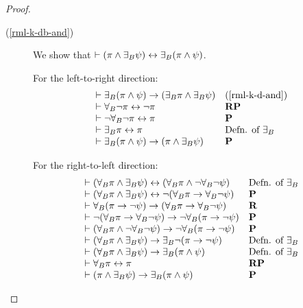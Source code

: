\begin{proof}
\begin{description}
    \item[(\ref{rml-k-db-and})]
    We show that $\vdash (\pi \land {\exists_{B}} \psi) \leftrightarrow {\exists_{B}} (\pi \land \psi)$.

    For the left-to-right direction:
    $$
    \begin{array}{ll}
        \vdash {\exists_{B}} (\pi \land \psi) \rightarrow ({\exists_{B}} \pi \land {\exists_{B}} \psi) & (\ref{rml-k-d-and})\\
        \vdash {\forall_{B}} \lnot \pi \leftrightarrow \lnot \pi & {\bf RP}\\
        \vdash \lnot {\forall_{B}} \lnot \pi \leftrightarrow \pi & {\bf P}\\
        \vdash {\exists_{B}} \pi \leftrightarrow \pi & \text{Defn. of ${\exists_{B}}$}\\
        \vdash {\exists_{B}} (\pi \land \psi) \rightarrow (\pi \land {\exists_{B}} \psi) & {\bf P}
    \end{array}
    $$

    For the right-to-left direction:
    $$
    \begin{array}{ll}
        \vdash ({\forall_{B}} \pi \land {\exists_{B}} \psi) \leftrightarrow ({\forall_{B}} \pi \land \lnot {\forall_{B}} \lnot \psi)& \text{Defn. of ${\exists_{B}}$}\\
        \vdash ({\forall_{B}} \pi \land {\exists_{B}} \psi) \leftrightarrow \lnot ({\forall_{B}} \pi \rightarrow {\forall_{B}} \lnot \psi)& {\bf P}\\
        \vdash {\forall_{B}} (\pi \rightarrow \lnot \psi) \rightarrow ({\forall_{B}} \pi \rightarrow {\forall_{B}} \lnot \psi)& {\bf R}\\
        \vdash \lnot ({\forall_{B}} \pi \rightarrow {\forall_{B}} \lnot \psi) \rightarrow \lnot {\forall_{B}} (\pi \rightarrow \lnot \psi)& {\bf P}\\
        \vdash ({\forall_{B}} \pi \land \lnot {\forall_{B}} \lnot \psi) \rightarrow \lnot {\forall_{B}} (\pi \rightarrow \lnot \psi)& {\bf P}\\
        \vdash ({\forall_{B}} \pi \land {\exists_{B}} \psi) \rightarrow {\exists_{B}} \lnot (\pi \rightarrow \lnot \psi)& \text{Defn. of ${\exists_{B}}$}\\
        \vdash ({\forall_{B}} \pi \land {\exists_{B}} \psi) \rightarrow {\exists_{B}} (\pi \land \psi)& \text{Defn. of ${\exists_{B}}$}\\
        \vdash {\forall_{B}} \pi \leftrightarrow \pi & {\bf RP}\\
        \vdash (\pi \land {\exists_{B}} \psi) \rightarrow {\exists_{B}} (\pi \land \psi)& {\bf P}\\
    \end{array}
    $$


\end{description}
\end{proof}
